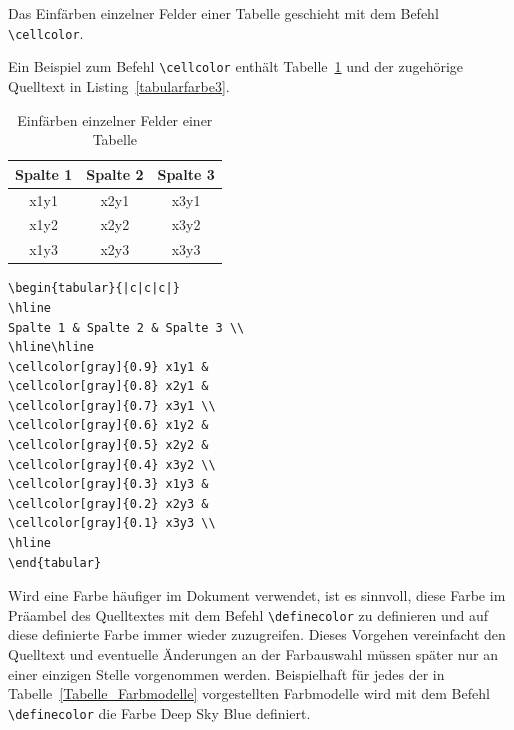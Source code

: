 \documentclass[a4paper,10pt,twoside]{scrbook}
\begin{document}
{Das Einfärben einzelner Felder einer Tabelle geschieht mit dem Befehl \verb!\cellcolor!.


Ein Beispiel zum Befehl \verb!\cellcolor! enthält Tabelle~\ref{Tabelle_Farbige_Zellen1} und der zugehörige Quelltext in Listing~\ref{tabularfarbe3}.

\begin{table}[h!tb]
\centering
\caption{Einfärben einzelner Felder einer Tabelle}
\label{Tabelle_Farbige_Zellen1}
\begin{tabular}{|c|c|c|}
\hline
Spalte 1 & Spalte 2 & Spalte 3 \\
\hline\hline
\cellcolor[gray]{0.9} x1y1 & 
\cellcolor[gray]{0.8} x2y1 & 
\cellcolor[gray]{0.7} x3y1 \\
\cellcolor[gray]{0.6} x1y2 & 
\cellcolor[gray]{0.5} x2y2 & 
\cellcolor[gray]{0.4} x3y2 \\
\cellcolor[gray]{0.3} x1y3 & 
\cellcolor[gray]{0.2} x2y3 & 
\cellcolor[gray]{0.1} x3y3 \\
\hline
\end{tabular}
\end{table}



\begin{lstlisting}[caption={Das Einfärben ganzer Felder (Zellen) einer Tabelle geschieht mit dem Befehl \texttt{cellcolor}},label=tabularfarbe3, style=customlatex]
\begin{tabular}{|c|c|c|}
\hline
Spalte 1 & Spalte 2 & Spalte 3 \\
\hline\hline
\cellcolor[gray]{0.9} x1y1 & 
\cellcolor[gray]{0.8} x2y1 & 
\cellcolor[gray]{0.7} x3y1 \\
\cellcolor[gray]{0.6} x1y2 & 
\cellcolor[gray]{0.5} x2y2 & 
\cellcolor[gray]{0.4} x3y2 \\
\cellcolor[gray]{0.3} x1y3 & 
\cellcolor[gray]{0.2} x2y3 & 
\cellcolor[gray]{0.1} x3y3 \\
\hline
\end{tabular}
\end{lstlisting}

Wird eine Farbe häufiger im Dokument verwendet, ist es sinnvoll, diese Farbe im Präambel des Quelltextes mit dem 
Befehl \verb!\definecolor! zu definieren und auf diese definierte Farbe immer wieder zuzugreifen. Dieses Vorgehen vereinfacht den Quelltext und eventuelle Änderungen an der Farbauswahl müssen später nur an einer einzigen Stelle vorgenommen werden. Beispielhaft für jedes der in Tabelle~\ref{Tabelle_Farbmodelle} vorgestellten Farbmodelle wird mit dem Befehl \verb!\definecolor! die Farbe Deep Sky Blue definiert.


}
\end{document}
